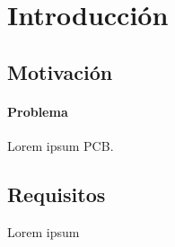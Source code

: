 \documentclass[../main.tex]{subfiles}%
\begin{document}
\chapter{Introducción} %
\label{chap:introduccion} %


\section{Motivación}
\subsubsection*{Problema}
Lorem ipsum \ac{PCB}.

\section{Requisitos}
Lorem ipsum

\end{document}
